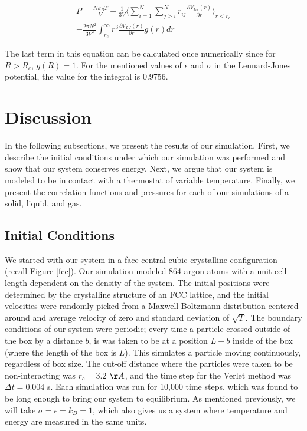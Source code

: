 \documentclass{article}
\begin{document}
\begin{multicols}{2}
\begin{equation}
\begin{split}
P = \frac{N k_B T}{V} - \frac{1}{3 V} \langle \sum\limits_{i=1}^N \sum\limits_{j>i}^N r_{ij} \frac{\partial V_{LJ}(r)}{\partial r}\rangle_{r < r_c} \\
- \frac{2 \pi N^2}{3 V^2} \int_{r_c}^\infty r^3 \frac{\partial V_{LJ}(r)}{\partial r} g(r) dr
\label{prescomp}
\end{split}
\end{equation}

\noindent The last term in this equation can be calculated once numerically since for $R>R_c$, $g(R) = 1$. For the mentioned values of $\epsilon$ and $\sigma$ in the Lennard-Jones potential, the value for the integral is $0.9756$.

\section{Discussion}
\label{disc}

In the following subsections, we present the results of our simulation.  First, we describe the initial conditions under which our simulation was performed and show that our system conserves energy.  Next, we argue that our system is modeled to be in contact with a thermostat of variable temperature.  Finally, we present the correlation functions and pressures for each of our simulations of a solid, liquid, and gas.

\subsection{Initial Conditions}

We started with our system in a face-central cubic crystalline configuration (recall Figure \ref{fcc}).  Our simulation modeled 864 argon atoms with a unit cell length dependent on the density of the system.  The initial positions were determined by the crystalline structure of an FCC lattice, and the initial velocities were randomly picked from a Maxwell-Boltzmann distribution centered around and average velocity of zero and standard deviation of $\sqrt{T}$.  The boundary conditions of our system were periodic; every time a particle crossed outside of the box by a distance $b$, is was taken to be at a position $L-b$ inside of the box (where the length of the box is $L$).  This simulates a particle moving continuously, regardless of box size.  The cut-off distance where the particles were taken to be non-interacting was $r_c = 3.2$ $\AA$, and the time step for the Verlet method was $\Delta t = 0.004$ s.  Each simulation was run for 10,000 time steps, which was found to be long enough to bring our system to equilibrium.  As mentioned previously, we will take $\sigma=\epsilon=k_B=1$, which also gives us a system where temperature and energy are measured in the same units.  


\end{multicols}
\end{document}
